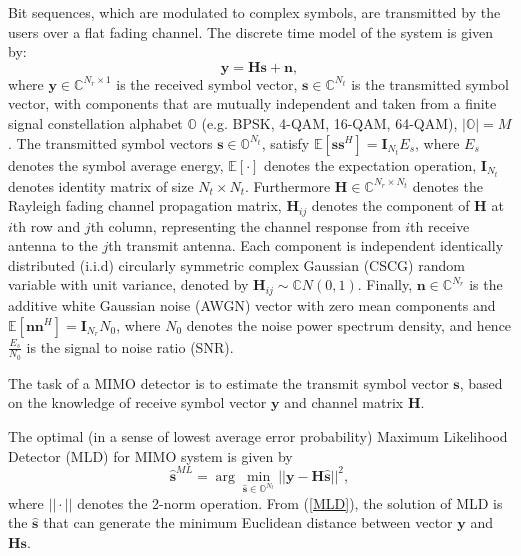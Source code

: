 \documentclass[12pt, draftclsnofoot, onecolumn]{IEEEtran}
\begin{document}
Bit sequences, which are modulated to complex symbols, are transmitted by the users over a flat fading channel. The discrete time model of the system is given by:
\begin{equation}
\mathbf{y}=\mathbf{H}\mathbf{s}+\mathbf{n},   \label{discrete time MIMO system}
\end{equation}
where $\mathbf{y}\in\mathbb{C}^{N_{r}\times 1}$ is the received symbol vector, $\mathbf{s}\in \mathbb{C}^{N_{t}}$ is the transmitted symbol vector, with components that are mutually independent and taken from a finite signal constellation alphabet $\mathbb{O}$ (e.g. BPSK, 4-QAM, 16-QAM, 64-QAM), $|\mathbb{O}|=M$. The transmitted symbol vectors $\mathbf{s}\in \mathbb{O}^{N_{t}}$, satisfy $\mathbb{E}[\mathbf{s}\mathbf{s}^{H}]=\mathbf{I}_{N_t}E_{s}$, where $E_{s}$ denotes the symbol average energy, $\mathbb{E}[\cdot]$ denotes the expectation operation, $\mathbf{I}_{N_{t}}$ denotes identity matrix of size $N_{t}\times N_{t}$. Furthermore $\mathbf{H}\in \mathbb{C}^{N_{r}\times N_{t}}$ denotes the Rayleigh fading channel propagation matrix, $\mathbf{H}_{ij}$ denotes the component of $\mathbf{H}$ at $i$th row and $j$th column, representing the channel response from $i$th receive antenna to the $j$th transmit antenna. Each component is independent identically distributed (i.i.d) circularly symmetric complex Gaussian (CSCG) random variable with unit variance, denoted by $\mathbf{H}_{ij}\sim \mathbb{C}N(0,1)$. Finally, $\mathbf{n}\in \mathbb{C}^{N_{r}}$ is the additive white Gaussian noise (AWGN) vector with zero mean components and $\mathbb{E}[\mathbf{n}\mathbf{n}^{H}]=\mathbf{I}_{N_{r}}N_{0}$, where $N_{0}$ denotes the noise power spectrum density, and hence $\frac{E_{s}}{N_{0}}$ is the signal to noise ratio (SNR). 

The task of a MIMO detector is to estimate the transmit symbol vector $\mathbf{s}$, based on the knowledge of receive symbol vector $\mathbf{y}$ and channel matrix $\mathbf{H}$.

The optimal (in a sense of lowest average error probability) Maximum Likelihood Detector (MLD) for MIMO system is given by
\begin{equation}
\hat{\mathbf{s}}^{ML}=\arg\min_{\hat{\mathbf{s}}\in \mathbb{O}^{N_{t}}}||\mathbf{y}-\mathbf{H}\hat{\mathbf{s}}||^{2},
\label{MLD}
\end{equation}
where $||\cdot||$ denotes the 2-norm operation. From (\ref{MLD}), the solution of MLD is the $\hat{\mathbf{s}}$ that can generate the minimum Euclidean distance between vector $\mathbf{y}$ and $\mathbf{H}\mathbf{s}$.
\end{document}
